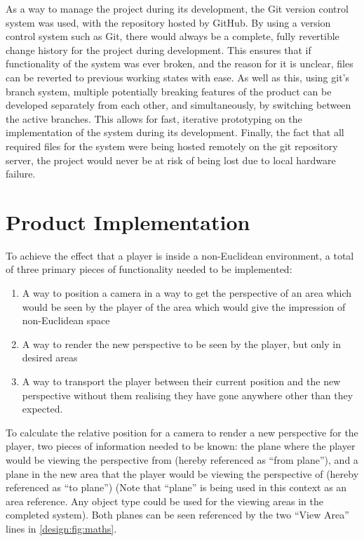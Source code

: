 		As a way to manage the project during its development, the Git version control system was used, with the repository hosted by GitHub.
		By using a version control system such as Git, there would always be a complete, fully revertible change history for the project during development.
		This ensures that if functionality of the system was ever broken, and the reason for it is unclear, files can be reverted to previous working states with ease.
		As well as this, using git's branch system, multiple potentially breaking features of the product can be developed separately from each other, and simultaneously, by switching between the active branches.
		This allows for fast, iterative prototyping on the implementation of the system during its development.
		Finally, the fact that all required files for the system were being hosted remotely on the git repository server, the project would never be at risk of being lost due to local hardware failure.

	\section[Implementation]{Product Implementation}
	\label{design:model}

		To achieve the effect that a player is inside a non-Euclidean environment, a total of three primary pieces of functionality needed to be implemented:
		\begin{enumerate}
			\item A way to position a camera in a way to get the perspective of an area which would be seen by the player of the area which would give the impression of non-Euclidean space
			\item A way to render the new perspective to be seen by the player, but only in desired areas
			\item A way to transport the player between their current position and the new perspective without them realising they have gone anywhere other than they expected.
		\end{enumerate}

		To calculate the relative position for a camera to render a new perspective for the player, two pieces of information needed to be known: the plane where the player would be viewing the perspective from (hereby referenced as \enquote{from plane}), and a plane in the new area that the player would be viewing the perspective of (hereby referenced as \enquote{to plane}) (Note that \enquote{plane} is being used in this context as an area reference. Any object type could be used for the viewing areas in the completed system).
		Both planes can be seen referenced by the two \enquote{View Area} lines in \autoref{design:fig:maths}.

